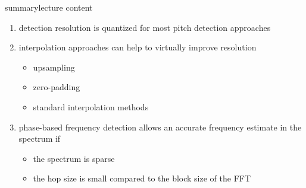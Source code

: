         \begin{frame}{summary}{lecture content}
            \begin{enumerate}
                \item       detection resolution is quantized for most pitch detection approaches
                \smallskip
                \item<2->   interpolation approaches can help to virtually improve resolution
                    \begin{itemize}
                        \item   upsampling
                        \item   zero-padding
                        \item   standard interpolation methods
                    \end{itemize}
                \smallskip
                \item<3->   phase-based frequency detection allows an accurate frequency estimate in the spectrum if
                    \begin{itemize}
                        \item   the spectrum is sparse
                        \item   the hop size is small compared to the block size of the FFT
                    \end{itemize}
            \end{enumerate}
        \end{frame}


